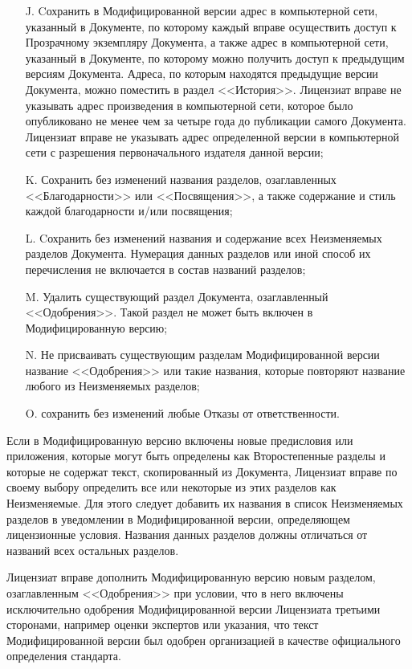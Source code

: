 \begin{itemize}
\item[J.]
   Cохранить в Модифицированной версии адрес в компьютерной сети,
   указанный в Документе, по которому каждый вправе осуществить доступ к
   Прозрачному экземпляру Документа, а также адрес в компьютерной сети,
   указанный в Документе, по которому можно получить доступ к предыдущим
   версиям Документа. Адреса, по которым находятся предыдущие версии
   Документа, можно поместить в раздел <<История>>. Лицензиат вправе не
   указывать адрес произведения в компьютерной сети, которое было
   опубликовано не менее чем за четыре года до публикации самого
   Документа. Лицензиат вправе не указывать адрес определенной версии в
   компьютерной сети с разрешения первоначального издателя данной версии;

\item[K.]
   Сохранить без изменений названия разделов, озаглавленных
   <<Благодарности>> или <<Посвящения>>, а также содержание и стиль
   каждой благодарности и/или посвящения;

\item[L.]
   Cохранить без изменений названия и содержание всех Неизменяемых
   разделов Документа. Нумерация данных разделов или иной способ их
   перечисления не включается в состав названий разделов;

\item[M.]
   Удалить существующий раздел Документа, озаглавленный <<Одобрения>>.
   Такой раздел не может быть включен в Модифицированную версию;

\item[N.]
   Не присваивать существующим разделам Модифицированной версии название
   <<Одобрения>> или такие названия, которые повторяют название любого
   из Неизменяемых разделов;

\item[O.]
   сохранить без изменений любые Отказы от ответственности.
\end{itemize}

Если в Модифицированную версию включены новые предисловия или приложения,
которые могут быть определены как Второстепенные разделы и которые не
содержат текст, скопированный из Документа, Лицензиат вправе по своему
выбору определить все или некоторые из этих разделов как Неизменяемые.
Для этого следует добавить их названия в список Неизменяемых разделов в
уведомлении в Модифицированной версии, определяющем лицензионные условия.
Названия данных разделов должны отличаться от названий всех остальных
разделов.

Лицензиат вправе дополнить Модифицированную версию новым разделом,
озаглавленным <<Одобрения>> при условии, что в него включены
исключительно одобрения Модифицированной версии Лицензиата третьими
сторонами, например оценки экспертов или указания, что текст
Модифицированной версии был одобрен организацией в качестве официального
определения стандарта.

